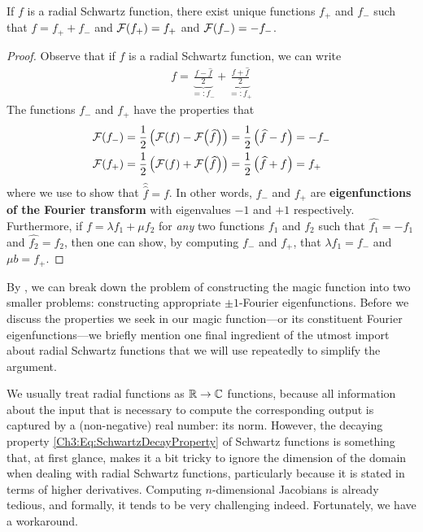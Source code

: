 \begin{boxtheorem}\label{Ch3:Thm:RadialSchwartz_eq_unique_sum_pm1_eigfun}
    If $f$ is a radial Schwartz function, there exist unique functions $f_+$ and $f_-$ such that $f = f_+ + f_-$ and $\mathcal{F}\!\left( f_+ \right) = f_+$ and $\mathcal{F}\!\left( f_- \right) = -f_-$.
\end{boxtheorem}
\begin{proof}
    Observe that if $f$ is a radial Schwartz function, we can write
    \begin{align*}
        f = \underbrace{\frac{f - \hat{f}}{2}}_{=: f_{-}} + \underbrace{\frac{f + \hat{f}}{2}}_{=: f_{+}}
    \end{align*}
    The functions $f_{-}$ and $f_{+}$ have the properties that
    \begin{align*}
        \mathcal{F}\!\left( f_{-} \right) &= \frac{1}{2} \left( \mathcal{F}\!\left( f \right) - \mathcal{F}\!\left( \widehat{f} \right) \right) = \frac{1}{2} \left( \widehat{f} - f \right) = -f_{-} \\
        \mathcal{F}\!\left( f_{+} \right) &= \frac{1}{2} \left( \mathcal{F}\!\left( f \right) + \mathcal{F}\!\left( \widehat{f} \right) \right) = \frac{1}{2} \left( \widehat{f} + f \right) = f_{+}
    \end{align*}
    where we use  to show that $\hat{\hat{f}} = f$. In other words, $f_{-}$ and $f_{+}$ are \textbf{eigenfunctions of the Fourier transform} with eigenvalues $-1$ and $+1$ respectively. Furthermore, if $f = \lambda f_1 + \mu f_2$ for \textit{any} two functions $f_1$ and $f_2$ such that $\hat{f_1} = -f_1$ and $\hat{f_2} = f_2$, then one can show, by computing $f_{-}$ and $f_{+}$, that $\lambda f_1 = f_{-}$ and $\mu b = f_{+}$.
\end{proof}

By , we can break down the problem of constructing the magic function into two smaller problems: constructing appropriate $\pm 1$-Fourier eigenfunctions. Before we discuss the properties we seek in our magic function---or its constituent Fourier eigenfunctions---we briefly mention one final ingredient of the utmost import about radial Schwartz functions that we will use repeatedly to simplify the argument.

We usually treat radial functions as $\mathbb{R} \to \mathbb{C}$ functions, because all information about the input that is necessary to compute the corresponding output is captured by a (non-negative) real number: its norm. However, the decaying property \eqref{Ch3:Eq:SchwartzDecayProperty} of Schwartz functions is something that, at first glance, makes it a bit tricky to ignore the dimension of the domain when dealing with radial Schwartz functions, particularly because it is stated in terms of higher derivatives. Computing $n$-dimensional Jacobians is already tedious, and formally, it tends to be very challenging indeed. Fortunately, we have a workaround.

